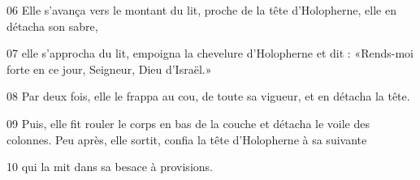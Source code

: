 
06 Elle s'avança vers le montant du lit, proche de la tête d'Holopherne, elle en détacha son sabre,

07 elle s'approcha du lit, empoigna la chevelure d'Holopherne et dit : «Rends-moi forte en ce jour, Seigneur, Dieu d'Israël.»

08 Par deux fois, elle le frappa au cou, de toute sa vigueur, et en détacha la tête.

09 Puis, elle fit rouler le corps en bas de la couche et détacha le voile des colonnes. Peu après, elle sortit, confia la tête d'Holopherne à sa suivante

10 qui la mit dans sa besace à provisions.